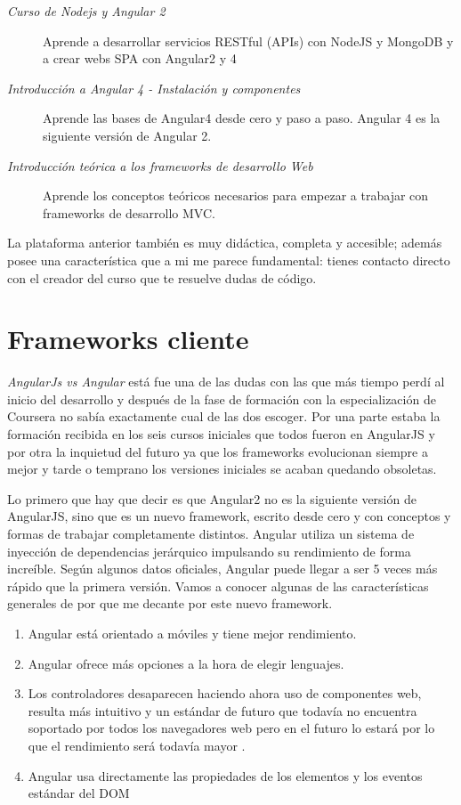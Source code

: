 \begin{description}
	\item[\emph{Curso de Nodejs y Angular 2}] Aprende a desarrollar servicios RESTful (APIs) con NodeJS y MongoDB y a crear webs SPA con Angular2 y 4
	\item[ \emph{Introducción a Angular 4 - Instalación y componentes}] Aprende las bases de Angular4 desde cero y paso a paso. Angular 4 es la siguiente versión de Angular 2.
	\item[ \emph{Introducción teórica a los frameworks de desarrollo Web}] Aprende los conceptos teóricos necesarios para empezar a trabajar con frameworks de desarrollo MVC.
\end{description}


La plataforma anterior también es muy didáctica, completa y accesible; además posee una característica que a mi me parece fundamental: tienes contacto directo con el creador del curso que te resuelve dudas de código. 


 \section{Frameworks cliente}\label{cliente}
 
 \emph{AngularJs vs Angular } está fue una de las dudas con las que más tiempo perdí al inicio del desarrollo y después de la fase de formación con la especialización de Coursera no sabía exactamente cual de las dos escoger. Por una parte estaba la formación recibida en los seis cursos iniciales que todos fueron en AngularJS y por otra la inquietud del futuro ya que los frameworks evolucionan siempre a mejor y tarde o temprano los versiones iniciales se acaban quedando obsoletas. 
 
 Lo primero que hay que decir es que Angular2 no es la siguiente versión de AngularJS, sino que es un nuevo framework, escrito desde cero y con conceptos y formas de trabajar completamente distintos. Angular utiliza un sistema de inyección de dependencias jerárquico impulsando su rendimiento de forma increíble.  Según algunos datos oficiales, Angular puede llegar a ser 5 veces más rápido que la primera versión.  Vamos a conocer algunas de las características generales de por que me decante por este nuevo framework. 
 
 \begin{enumerate}
	\item Angular está orientado a móviles y tiene mejor rendimiento.
	\item Angular ofrece más opciones a la hora de elegir lenguajes.
	\item Los controladores desaparecen haciendo ahora uso de componentes web, resulta más intuitivo y un estándar de futuro que todavía no encuentra soportado por todos los navegadores web pero en el futuro lo estará por lo que el rendimiento será todavía mayor .
	\item Angular usa directamente las propiedades de los elementos y los eventos estándar del DOM
\end{enumerate}
 
